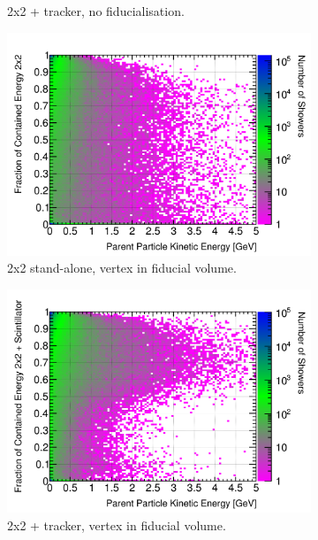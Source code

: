 \documentclass[10pt,a4paper,openany]{article}
\begin{document}
\begin{figure}[!htb]
\begin{subfigure}[b]{0.49\textwidth}
		\caption{2x2 + tracker, no fiducialisation.}
		\label{}
	\end{subfigure}	
	\begin{subfigure}[b]{0.49\textwidth}
		\centering
    \includegraphics[width=1.0\textwidth]{EM_contained_frac_2x2_fiducial.png}
		\caption{2x2 stand-alone, vertex in fiducial volume.}
		\label{}
	\end{subfigure}	
	\hfill
	\begin{subfigure}[b]{0.49\textwidth}
		\centering
		\includegraphics[width=1.0\textwidth]{EM_contained_frac_2x2_Scintillator_fiducial_gap.png}
		\caption{2x2 + tracker, vertex in fiducial volume.}
		\label{}
	\end{subfigure}
	\begin{subfigure}[b]{0.49\textwidth}

\end{subfigure}
\end{figure}
\end{document}
